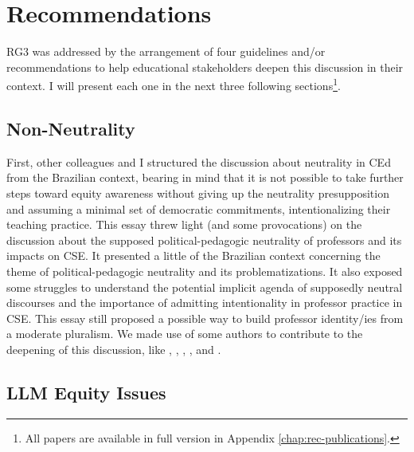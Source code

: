 \section{Recommendations}
\label{disc-sec:recommendations}

\gls{RG}3 was addressed by the arrangement of four guidelines and/or recommendations to help educational stakeholders deepen this discussion in their context. I will present each one in the next three following sections\footnote{All papers are available in full version in Appendix \ref{chap:rec-publications}.}.

\subsection{Non-Neutrality}
\label{disc-ss:neutrality}

First, other colleagues and I
structured the discussion about neutrality in \gls{CEd} \cite{bispojr:2022-educomp} from the Brazilian context, bearing in mind that it is not possible to take further steps toward equity awareness without giving up the neutrality presupposition and assuming a minimal set of democratic commitments, intentionalizing their teaching practice. This essay threw light (and some provocations) on the discussion about the supposed political-pedagogic neutrality of professors and its impacts on \gls{CSE}. It presented a little of the Brazilian context concerning the theme of political-pedagogic neutrality and its problematizations. It also exposed some struggles to understand the potential implicit agenda of supposedly neutral discourses and the importance of admitting intentionality in professor practice in \gls{CSE}. This essay still proposed a possible way to build professor identity/ies from a moderate pluralism. We made use of some authors to contribute to the deepening of this discussion, like , , , , and .

\subsection{LLM Equity Issues}
\label{disc-ss:llm-equity-issues}

